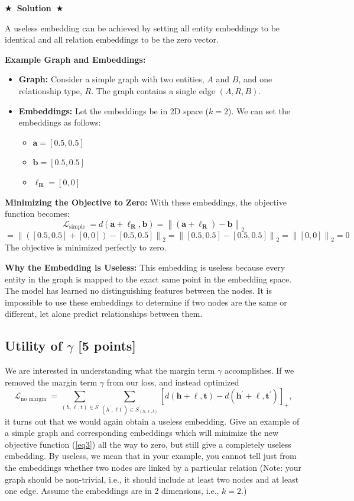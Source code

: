 \documentclass{article}
\numberwithin{figure}{section}
\newcommand{\Solution}[1]{%
    {%
        \medskip
        \color{red}
        \bf $\bigstar$~\sf\textbf{Solution}~$\bigstar$ \sf
        #1
    }
    \bigskip
}
\begin{document}
\Solution{
	A useless embedding can be achieved by setting all entity embeddings to be identical and all relation embeddings to be the zero vector.
	
	\textbf{Example Graph and Embeddings:}
	\begin{itemize}
		\item \textbf{Graph:} Consider a simple graph with two entities, $A$ and $B$, and one relationship type, $R$. The graph contains a single edge $(A, R, B)$.
		\item \textbf{Embeddings:} Let the embeddings be in 2D space ($k=2$). We can set the embeddings as follows:
		\begin{itemize}
			\item $\mathbf{a} = [0.5, 0.5]$
			\item $\mathbf{b} = [0.5, 0.5]$
			\item $\boldsymbol{\ell_R} = [0, 0]$
		\end{itemize}
	\end{itemize}
	
	\textbf{Minimizing the Objective to Zero:}
	With these embeddings, the objective function becomes:
	\[ \mathcal{L}_{\text {simple }} = d(\mathbf{a} + \boldsymbol{\ell_R}, \mathbf{b}) = \left\| (\mathbf{a} + \boldsymbol{\ell_R}) - \mathbf{b} \right\|_2 \]
	\[ = \left\| ([0.5, 0.5] + [0, 0]) - [0.5, 0.5] \right\|_2 = \left\| [0.5, 0.5] - [0.5, 0.5] \right\|_2 = \left\| [0, 0] \right\|_2 = 0 \]
	The objective is minimized perfectly to zero.
	
	\textbf{Why the Embedding is Useless:}
	This embedding is useless because every entity in the graph is mapped to the exact same point in the embedding space. The model has learned no distinguishing features between the nodes. It is impossible to use these embeddings to determine if two nodes are the same or different, let alone predict relationships between them.
}

\subsection{Utility of $\gamma$  [5 points]}
We are interested in understanding what the margin term $\gamma$ accomplishes. If we removed the margin term $\gamma$ from our loss, and instead optimized
\begin{equation}\label{eq3}
\mathcal{L}_{\text {no margin }}=\sum_{(h, \ell, t) \in S} \sum_{\left(h^{\prime}, \ell t^{\prime}\right) \in S_{(h, \ell, t)}^{\prime}}\left[d(\mathbf{h}+\boldsymbol{\ell}, \mathbf{t})-d\left(\mathbf{h}^{\prime}+\boldsymbol{\ell}, \mathbf{t}^{\prime}\right)\right]_{+},
\end{equation}
it turns out that we would again obtain a useless embedding. Give an example of a simple graph and corresponding embeddings which will minimize the new objective function (\ref{eq3}) all the way to zero, but still give a completely useless embedding. By useless, we mean that in your example, you cannot tell just from the embeddings whether two nodes are linked by a particular relation (Note: your graph should be non-trivial, i.e., it should include at least two nodes and at least one edge. Assume the embeddings are in 2 dimensions, i.e., $k=2$.)
\end{document}
